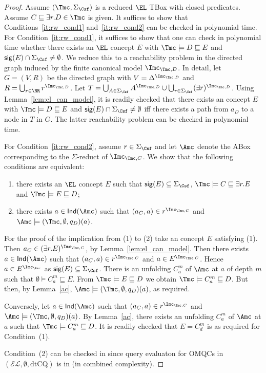\documentclass{lmcs}
\theoremstyle{definition}
\begin{document}
\begin{proof}
Assume $(\Tmc,\Sigma_{\Csf})$ is a reduced $\EL$ TBox with closed predicates.
Assume $C\sqsubseteq \exists r.D\in \Tmc$ is given. It suffices to show that
Conditions~\ref{it:rw_cond1} and~\ref{it:rw_cond2} can be checked in polynomial time.
For Condition~\ref{it:rw_cond1}, it suffices to show that one can check in polynomial time whether there
exists an $\EL$ concept $E$ with $\Tmc\models D \sqsubseteq E$ and ${\sf sig}(E)\cap \Sigma_{\Csf}\not=\emptyset$.
We reduce this to a reachability problem in the directed graph induced by the finite canonical model $\Imc_{\Tmc,D}$. 
In detail, let $G=(V,R)$ be the directed graph
with $V=\Delta^{\Imc_{\Tmc,D}}$ and $R = \bigcup_{r\in \NR}r^{\Imc_{\Tmc,D}}$. Let $T= \bigcup_{A\in \Sigma_{\Csf}}A^{\Imc_{\Tmc,D}}\cup
\bigcup_{r\in \Sigma_{\Csf}}(\exists r)^{\Imc_{\Tmc,D}}$.
Using Lemma~\ref{lem:el_can_model}, it is readily checked that there exists an \el concept $E$
with $\Tmc\models D \sqsubseteq E$ and ${\sf sig}(E)\cap \Sigma_{\Csf}\not=\emptyset$ iff
there exists a path from $a_{D}$ to a node in $T$ in $G$. The latter reachability problem can be checked in
polynomial time.

For Condition~\ref{it:rw_cond2}, assume $r\in \Sigma_{\Csf}$ and let $\Amc$ denote the ABox corresponding to 
the $\Sigma$-reduct of $\Imc_{\Tmc,C}$. We show that the following conditions are equivalent:
\begin{enumerate}
\item there exists an $\EL$ concept $E$ such that ${\sf sig}(E)\subseteq \Sigma_{\Csf}$, $\Tmc \models C\sqsubseteq \exists r.E$
and $\Tmc\models E \sqsubseteq D$;
\item there exists $a\in {\sf Ind}(\Amc)$ such that $(a_{C},a)\in r^{\Imc_{\Tmc,C}}$ and $\Amc\models (\Tmc,\emptyset,q_{D})(a)$.
\end{enumerate}
For the proof of the implication from (1) to (2) take an \el concept $E$ satisfying (1). Then $a_{C} \in (\exists r.E)^{\Imc_{\Tmc,C}}$, 
by Lemma~\ref{lem:el_can_model}. Then there exists $a\in {\sf Ind}(\Amc)$ such that $(a_{C},a)\in r^{\Imc_{\Tmc,C}}$ and $a\in E^{\Imc_{\Tmc,C}}$. 
Hence $a\in E^{\Imc_{\Amc}}$ as ${\sf sig}(E)\subseteq \Sigma_{\Csf}$. There is an unfolding $C_{a}^{m}$ of $\Amc$ at $a$ of depth $m$ such that 
$\emptyset \models C_{a}^{m}\sqsubseteq E$.
From $\Tmc\models E \sqsubseteq D$ we obtain $\Tmc\models C_{a}^{m}\sqsubseteq D$. 
But then, by Lemma~\ref{ac}, $\Amc\models (\Tmc,\emptyset,q_{D})(a)$, as required.

Conversely, let $a\in {\sf Ind}(\Amc)$ such that $(a_{C},a)\in r^{\Imc_{\Tmc,C}}$ and $\Amc\models (\Tmc,\emptyset,q_{D})(a)$.
By Lemma~\ref{ac}, there exists an unfolding $C_{a}^{m}$ of $\Amc$ at $a$ such that $\Tmc \models C_{a}^{m}\sqsubseteq D$.
It is readily checked that $E=C_{d}^{m}$ is as required for Condition~(1).

Condition~(2) can be checked in \ptime since query evaluaton for OMQCs in $(\mathcal{EL},\emptyset,\text{dtCQ})$ is in \ptime
(in combined complexity).
\end{proof}
\end{document}
